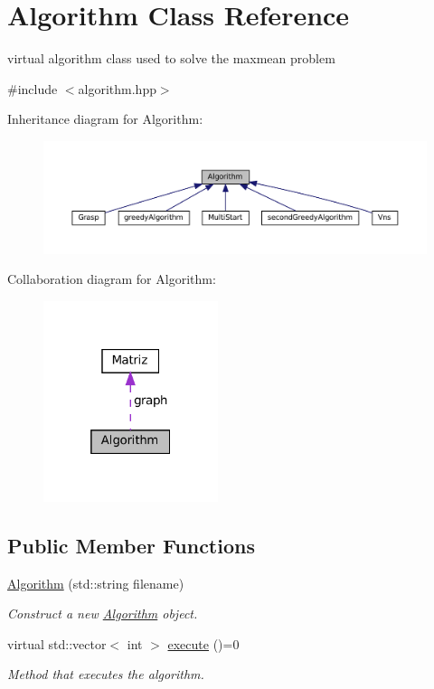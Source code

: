 \hypertarget{classAlgorithm}{}\section{Algorithm Class Reference}
\label{classAlgorithm}


virtual algorithm class used to solve the maxmean problem  




{\ttfamily \#include $<$algorithm.\+hpp$>$}



Inheritance diagram for Algorithm\+:\nopagebreak
\begin{figure}[H]
\begin{center}
\leavevmode
\includegraphics[width=350pt]{classAlgorithm__inherit__graph}
\end{center}
\end{figure}


Collaboration diagram for Algorithm\+:\nopagebreak
\begin{figure}[H]
\begin{center}
\leavevmode
\includegraphics[width=145pt]{classAlgorithm__coll__graph}
\end{center}
\end{figure}
\subsection*{Public Member Functions}
\begin{DoxyCompactItemize}
\item 
\hyperlink{classAlgorithm_a89df1d2c6751f70733f38daa0ee2a13b}{Algorithm} (std\+::string filename)
\begin{DoxyCompactList}\small\item\em Construct a new \hyperlink{classAlgorithm}{Algorithm} object. \end{DoxyCompactList}\item 
virtual std\+::vector$<$ int $>$ \hyperlink{classAlgorithm_af6ea9eb9a6dbd41896e3fd7dabac096b}{execute} ()=0
\begin{DoxyCompactList}\small\item\em Method that executes the algorithm. \end{DoxyCompactList}\end{DoxyCompactItemize}
